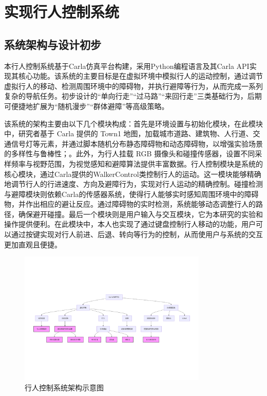 \chapter{实现行人控制系统}

\section{系统架构与设计初步}
本行人控制系统基于Carla仿真平台构建，采用Python编程语言及其Carla API实现其核心功能。该系统的主要目标是在虚拟环境中模拟行人的运动控制，通过调节虚拟行人的移动、检测周围环境中的障碍物，并执行避障等行为，从而完成一系列复杂的导航任务。初步设计的“单向行走”“过马路”“来回行走”三类基础行为，后期可便捷地扩展为“随机漫步”“群体避障”等高级策略。

该系统的架构主要由以下几个模块构成：首先是环境设置与初始化模块，在此模块中，研究者基于 Carla 提供的 Town1 地图，加载城市道路、建筑物、人行道、交通信号灯等元素，并通过脚本随机分布静态障碍物和动态障碍物，以增强实验场景的多样性与鲁棒性；。此外，为行人挂载 RGB 摄像头和碰撞传感器，设置不同采样频率与视野范围，为视觉感知和避障算法提供丰富数据。行人控制模块是系统的核心模块，通过Carla提供的WalkerControl类控制行人的运动。这一模块能够精确地调节行人的行进速度、方向及避障行为，实现对行人运动的精确控制。碰撞检测与避障模块则依赖Carla的传感器系统，使得行人能够实时感知周围环境中的障碍物，并作出相应的避让反应。通过障碍物的实时检测，系统能够动态调整行人的路径，确保避开碰撞。最后一个模块则是用户输入与交互模块，它为本研究的实验和操作提供便利。在此模块中，本人也实现了通过键盘控制行人移动的功能，用户可以通过按键实现对行人前进、后退、转向等行为的控制，从而使用户与系统的交互更加直观且便捷。

\begin{figure}[hbt]
    \centering
    \includegraphics[width=0.8\textwidth]{images/system_architecture.pdf}
    \caption{行人控制系统架构示意图}
    \label{f.system_architecture}
\end{figure}

